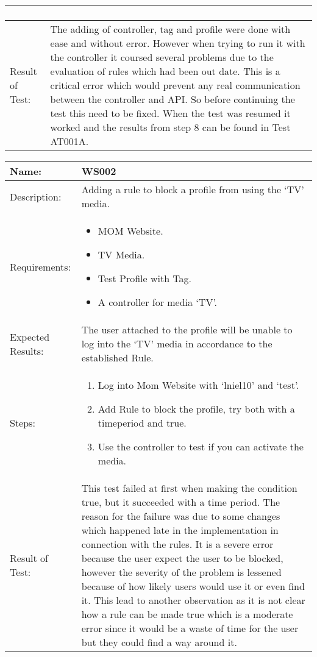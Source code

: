 \begin{table}[h]
\begin{tabular}{|l|p{9cm}|}
\begin{enumerate}
		\end{enumerate}
		\\		
		\hline
		Result of Test: & The adding of controller, tag and profile were done with ease and without error. However when trying to run it with the controller it coursed several problems due to the evaluation of rules which had been out date. This is a critical error which would prevent any real communication between the controller and API. So before continuing the test this need to be fixed. When the test was resumed it worked and the results from step 8 can be found in Test AT001A. \\
		\hline
		\end{tabular}
\end{table}

\begin{table}[h]
	\centering
		\begin{tabular}{|l|p{9cm}|}
		\hline
		\hline
		Name: & WS002\\
		\hline
		Description: & Adding a rule to block a profile from using the `TV' media.\\
		\hline
		Requirements: & 
		\begin{itemize}
			\item MOM Website.
			\item TV Media.
			\item Test Profile with Tag.
			\item A controller for media `TV'.
		\end{itemize}
		\\
		\hline
		Expected Results: & The user attached to the profile will be unable to log into the `TV' media in accordance to the established Rule.\\
		\hline
		Steps: & 
		\begin{enumerate}
			\item Log into Mom Website with `lniel10' and `test'.
			\item Add Rule to block the profile, try both with a timeperiod and true.
			\item Use the controller to test if you can activate the media.
		\end{enumerate}
		\\		
		\hline
		Result of Test: &  This test failed at first when making the condition true, but it succeeded with a time period. The reason for the failure was due to some changes which happened late in the implementation in connection with the rules. It is a severe error because the user expect the user to be blocked, however the severity of the problem is lessened because of how likely users would use it or even find it. This lead to another observation as it is not clear how a rule can be made true which is a moderate error since it would be a waste of time for the user but they could find a way around it.\\
		\hline
		\end{tabular}
\end{table}


